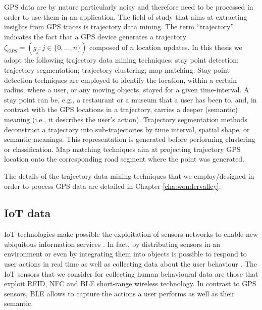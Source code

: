 GPS data are by nature particularly noisy and therefore need to be processed in order to use them in an application.
The field of study that aims at extracting insights from GPS traces is trajectory data mining. The term ``trajectory'' indicates the fact that a GPS device generates a trajectory %
$\zeta_{GPS} = (g_j: j \in \{ 0, \dots, n\})$ 
composed of $n$ location updates. In this thesis we adopt the following trajectory data mining techniques: stay point detection; trajectory segmentation; trajectory clustering; map matching. Stay point detection techniques are employed to identify the location, within a certain radius, where a user, or any moving objects, stayed for a given time-interval. A stay point can be, e.g., a restaurant or a museum that a user has been to, and, in contrast with the GPS locations in a trajectory, carries a deeper (semantic) meaning (i.e., it describes the user's action). Trajectory segmentation methods deconstruct a trajectory into sub-trajectories by time interval, spatial shape, or semantic meanings. This representation is generated before performing clustering or classification. Map matching techniques aim at projecting trajectory GPS location onto the corresponding road segment where the point was generated.

The details of the trajectory data mining techniques that we employ/designed in order to process GPS data are detailed in Chapter \ref{cha:wondervalley}.

\subsection{IoT data}
IoT technologies make possible the exploitation of sensors networks to enable new ubiquitous information services \cite{iotdef:li,li:zhao:2015}. In fact, by distributing sensors in an environment or even by integrating them into objects is possible to respond to user actions in real time as well as collecting data about the user behaviour \cite{iot:notifications, iot-sensor-healthcare, petrelli2013integrating}.
The IoT sensors that we consider for collecting human behavioural data are those that exploit  RFID, NFC and BLE short-range wireless technology. In contrast to GPS sensors, BLE allows to capture the actions a user performs as well as their semantic. 

